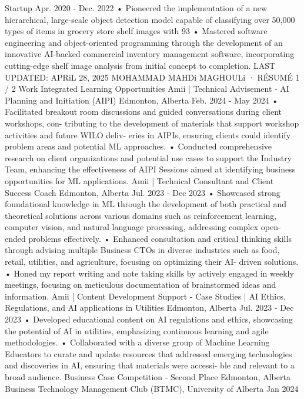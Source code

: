 Startup Apr. 2020 - Dec. 2022
• Pioneered the implementation of a new hierarchical, large-scale object detection model capable of
classifying over 50,000 types of items in grocery store shelf images with 93%
• Mastered software engineering and object-oriented programming through the development of an
innovative AI-backed commercial inventory management software, incorporating cutting-edge
shelf image analysis from initial concept to completion.
LAST UPDATED: APRiL 28, 2025 MOHAMMAD MAHDi MAGHOULi · RÉSUMÉ 1 / 2
Work Integrated Learning Opportunities
Amii | Technical Advisement - AI Planning and Initiation (AIPI) Edmonton, Alberta
Feb. 2024 - May 2024
• Facilitated breakout room discussions and guided conversations during client workshops, con-
tributing to the development of materials that support workshop activities and future WILO deliv-
eries in AIPIs, ensuring clients could identify problem areas and potential ML approaches.
• Conducted comprehensive research on client organizations and potential use cases to support
the Industry Team, enhancing the effectiveness of AIPI Sessions aimed at identifying business
opportunities for ML applications.
Amii | Technical Consultant and Client Success Coach Edmonton, Alberta
Jul. 2023 - Dec 2023
• Showcased strong foundational knowledge in ML through the development of both practical and
theoretical solutions across various domains such as reinforcement learning, computer vision, and
natural language processing, addressing complex open-ended problems effectively.
• Enhanced consultation and critical thinking skills through advising multiple Business CTOs in
diverse industries such as food, retail, utilities, and agriculture, focusing on optimizing their AI-
driven solutions.
• Honed my report writing and note taking skills by actively engaged in weekly meetings, focusing
on meticulous documentation of brainstormed ideas and information.
Amii | Content Development Support - Case Studies | AI Ethics,
Regulations, and AI applications in Utilities Edmonton, Alberta
Jul. 2023 - Dec 2023
• Developed educational content on AI regulations and ethics, showcasing the potential of AI in
utilities, emphasizing continuous learning and agile methodologies.
• Collaborated with a diverse group of Machine Learning Educators to curate and update resources
that addressed emerging technologies and discoveries in AI, ensuring that materials were accessi-
ble and relevant to a broad audience.
Business Case Competition - Second Place Edmonton, Alberta
Business Technology Management Club (BTMC), University of Alberta Jan 2024

